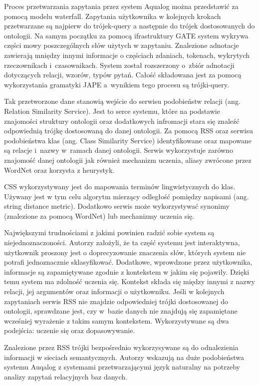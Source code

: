 Proces przetwarzania zapytania przez system Aqualog można przedstawić za pomocą modelu waterfall. Zapytania użytkownika w kolejnych krokach przetwarzane są najpierw do trójek-query a następnie do trójek dostosowanych do ontologii. Na samym początku za pomocą ifrastruktury GATE system wykrywa części mowy poszczególnych słów użytych w zapytaniu. Znalezione adnotacje zawierają mniędzy innymi informacje o częściach zdaniach, tokenach, wykrytych rzeczownikach i~czasownikach. System został rozszerzony o~zbiór adnotacji dotyczących relacji, wzorów, typów pytań. Całość składowana jest za pomocą wykorzystania gramatyki JAPE a~wynikiem tego procesu są trójki-query.

Tak przetworzone dane stanowią wejście do serwisu podobieństw relacji (ang. Relation Similarity Service). Jest to serce systemu, które na podstawie znajomości struktury ontologii oraz dodatkowych infromacji stara się znaleźć odpowiednią trójkę dostosowaną do danej ontologii. Za pomocą RSS oraz serwisu podobieństwa klas (ang. Class Similarity Service) identyfikowane oraz mapowane są relacje i~nazwy w~ramach danej ontologii. Serwis wykorzystuje zarówno znajomość danej ontologii jak również mechanizm uczenia, aliasy zwrócone przez WordNet oraz korzysta z heurystyk.

CSS wykorzystywany jest do mapowania terminów lingwistycznych do klas. Używany jest w tym celu algorytm mierzący odległość pomiędzy napisami (ang. string distance metric). Dodatkowo serwis może wykorzystywać synonimy (znalezione za pomocą WordNet) lub mechanizmy uczenia się. 

Największymi trudnościami z jakimi powinien radzić sobie system są niejednoznaczoności. Autorzy założyli, że ta część systemu jest interaktywna, użytkownik proszony jest o doprecyzowanie znaczenia słów, których system nie potrafi jednoznacznie sklasyfikować. Dodatkowe, wprowdzone przez użytkownika, informacje są zapamiętywane zgodnie z kontekstem w jakim się pojawiły. Dzięki temu system ma zdolność uczenia się. Kontekst składa się między innymi z nazwy relacji, jej argumentów oraz informacji o użytkowniku. Jeśli w kolejnych zapytaniach serwis RSS nie znajdzie odpowiedniej trójki dostosowanej do ontologii, sprawdzane jest, czy w~bazie danych nie znajdują się zapamiętane wcześniej wyrażenie z takim samym kontekstem. Wykorzystywane są dwa podejścia: uczenie się oraz dopasowywanie.

Znalezione przez RSS trójki bezpośrednio wykorzysywane są do odnalezienia informacji w sieciach semantycznych. Autorzy wskazują na duże podobieństwa systemu Auqalog z systemami przetwarzającymi język naturalny na potrzeby analizy zapytań relacyjnych baz danych\cite{lopez2005aqualog}.

